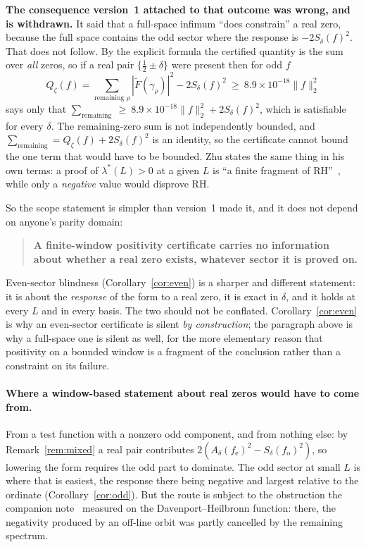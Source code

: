 \documentclass[11pt,a4paper]{article}
\theoremstyle{remark}
\newcommand{\Ad}{A_\delta}
\newcommand{\Sd}{S_\delta}
\begin{document}
\textbf{The consequence version~1 attached to that outcome was wrong, and is withdrawn.} It
said that a full-space infimum ``does constrain'' a real zero, because the full space
contains the odd sector where the response is $-2\Sd(f)^2$. That does not follow. By the
explicit formula the certified quantity is the sum over \emph{all} zeros, so if a real pair
$\{\tfrac12\pm\delta\}$ were present then for odd $f$
\[
  Q_\zeta(f)=\sum_{\text{remaining }\rho}|\widetilde F(\gamma_\rho)|^2-2\Sd(f)^2
  \ \ge\ 8.9\times10^{-18}\|f\|_2^2
\]
says only that $\sum_{\text{remaining}}\ \ge\ 8.9\times10^{-18}\|f\|_2^2+2\Sd(f)^2$, which is
satisfiable for every $\delta$. The remaining-zero sum is not independently bounded, and
$\sum_{\text{remaining}}=Q_\zeta(f)+2\Sd(f)^2$ is an identity, so the certificate cannot
bound the one term that would have to be bounded. Zhu states the same thing in his own terms:
a proof of $\lambda^*(L)>0$ at a given $L$ is ``a finite fragment of RH''~\cite[\S1.1]{Zhu},
while only a \emph{negative} value would disprove RH.

So the scope statement is simpler than version~1 made it, and it does not depend on anyone's
parity domain:
\begin{quote}
\textbf{A finite-window positivity certificate carries no information about whether a real
zero exists, whatever sector it is proved on.}
\end{quote}
Even-sector blindness (Corollary~\ref{cor:even}) is a sharper and different statement: it is
about the \emph{response} of the form to a real zero, it is exact in $\delta$, and it holds at
every $L$ and in every basis. The two should not be conflated. Corollary~\ref{cor:even} is why
an even-sector certificate is silent \emph{by construction}; the paragraph above is why a
full-space one is silent as well, for the more elementary reason that positivity on a bounded
window is a fragment of the conclusion rather than a constraint on its failure.

\paragraph{Where a window-based statement about real zeros would have to come from.}
From a test function with a nonzero odd component, and from nothing else: by
Remark~\ref{rem:mixed} a real pair contributes
$2(\Ad(f_{\mathrm{e}})^2-\Sd(f_{\mathrm{o}})^2)$, so lowering the form requires the odd part
to dominate. The odd sector at small $L$ is where that is easiest, the response there being
negative and largest relative to the ordinate (Corollary~\ref{cor:odd}). But the route is subject to the obstruction the companion
note~\cite{DHnote} measured on the Davenport--Heilbronn function: there, the negativity
produced by an off-line orbit was partly cancelled by the remaining spectrum.
\end{document}
